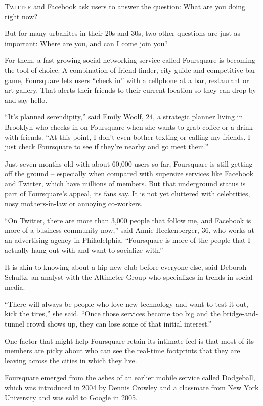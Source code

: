 ﻿\documentclass[12pt]{article}
\begin{document}
\lettrine{T}{witter} and Facebook ask users to answer the question: What are
you doing right now?

But for many urbanites in their 20s and 30s, two other questions are just as important: Where are
you, and can I come join you?

For them, a fast-growing social networking service called Foursquare is becoming the tool of choice.
A combination of friend-finder, city guide and competitive bar game, Foursquare lets users ``check
in'' with a cellphone at a bar, restaurant or art gallery. That alerts their friends to their
current location so they can drop by and say hello.

``It's planned serendipity,'' said Emily Woolf, 24, a strategic planner living in Brooklyn who
checks in on Foursquare when she wants to grab coffee or a drink with friends. ``At this point, I
don't even bother texting or calling my friends. I just check Foursquare to see if they're nearby
and go meet them.''

Just seven months old with about 60,000 users so far, Foursquare is still getting off the ground --
especially when compared with supersize services like Facebook and Twitter, which have millions of
members. But that underground status is part of Foursquare's appeal, its fans say. It is not yet
cluttered with celebrities, nosy mothers-in-law or annoying co-workers.

``On Twitter, there are more than 3,000 people that follow me, and Facebook is more of a business
community now,'' said Annie Heckenberger, 36, who works at an advertising agency in Philadelphia.
``Foursquare is more of the people that I actually hang out with and want to socialize with.''

It is akin to knowing about a hip new club before everyone else, said Deborah Schultz, an analyst
with the Altimeter Group who specializes in trends in social media.

``There will always be people who love new technology and want to test it out, kick the tires,'' she
said. ``Once those services become too big and the bridge-and-tunnel crowd shows up, they can lose
some of that initial interest.''

One factor that might help Foursquare retain its intimate feel is that most of its members are
picky\cite{picky} about who can see the real-time footprints that they are leaving across the cities
in which they live.

Foursquare emerged from the ashes of an earlier mobile service called Dodgeball, which was
introduced in 2004 by Dennis Crowley and a classmate from New York University and was sold to Google
in 2005.
\end{document}
